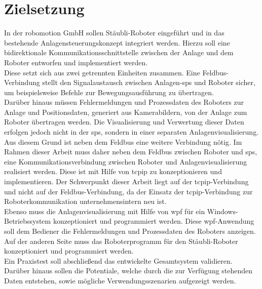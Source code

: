 \documentclass[ a4paper,
                oneside,
                toc=bibliography,
                toc=listof
                ]{scrbook}
\begin{document}
	\section{Zielsetzung}
	In der \glqq robomotion GmbH\grqq{} sollen Stäubli-Roboter eingeführt und in das bestehende Anlagensteuerungskonzept integriert werden. Hierzu soll eine bidirektionale Kommunikationsschnittstelle zwischen der Anlage und dem Roboter entworfen und implementiert werden. \\
	Diese setzt sich aus zwei getrennten Einheiten zusammen. Eine Feldbus-Verbindung stellt den Signalaustausch zwischen Anlagen-\ac{sps} und Roboter sicher, um beispielsweise Befehle zur Bewegungsausführung zu übertragen.\\
	Darüber hinaus müssen Fehlermeldungen und Prozessdaten des Roboters zur Anlage und Positionsdaten, generiert aus Kamerabildern, von der Anlage zum Roboter übertragen werden. Die Visualisierung und Verwertung dieser Daten erfolgen jedoch nicht in der \ac{sps}, sondern in einer separaten Anlagenvisualisierung.\\
	Aus diesem Grund ist neben dem Feldbus eine weitere Verbindung nötig. Im Rahmen dieser Arbeit muss daher neben dem Feldbus zwischen Roboter und \ac{sps}, eine Kommunikationsverbindung zwischen Roboter und Anlagenvisualisierung realisiert werden. Diese ist mit Hilfe von \ac{tcpip} zu konzeptionieren und implementieren. Der Schwerpunkt dieser Arbeit liegt auf der \ac{tcpip}-Verbindung und nicht auf der Feldbus-Verbindung, da der Einsatz der \ac{tcpip}-Verbindung zur Roboterkommunikation unternehmensintern neu ist.\\
	Ebenso muss die Anlagenvisualisierung mit Hilfe von \ac{wpf} für ein Windows-Betriebssystem konzeptioniert und programmiert werden. Diese \ac{wpf}-Anwendung soll dem Bediener die Fehlermeldungen und Prozessdaten des Roboters anzeigen. Auf der anderen Seite muss das Roboterprogramm für den Stäubli-Roboter konzeptioniert und programmiert werden. \\
	Ein Praxistest soll abschließend das entwickelte Gesamtsystem validieren. Darüber hinaus sollen die Potentiale, welche durch die zur Verfügung stehenden Daten entstehen, sowie mögliche Verwendungsszenarien aufgezeigt werden.
	
\end{document}
